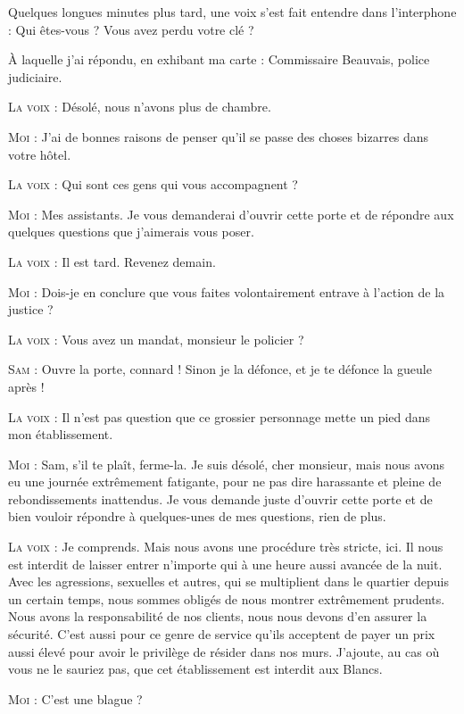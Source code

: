 \begin{dialogue}

Quelques longues minutes plus tard, une voix s’est fait entendre dans l’interphone : Qui êtes-vous ? Vous avez perdu votre clé ?

À laquelle j’ai répondu, en exhibant ma carte : Commissaire Beauvais, police judiciaire.

\textsc{La voix} : Désolé, nous n’avons plus de chambre.

\textsc{Moi} : J’ai de bonnes raisons de penser qu’il se passe des choses bizarres dans votre hôtel.

\textsc{La voix} : Qui sont ces gens qui vous accompagnent ?

\textsc{Moi} : Mes assistants. Je vous demanderai d’ouvrir cette porte et de répondre aux quelques questions que j’aimerais vous poser.

\textsc{La voix} : Il est tard. Revenez demain.

\textsc{Moi} : Dois-je en conclure que vous faites volontairement entrave à l’action de la justice ?

\textsc{La voix} : Vous avez un mandat, monsieur le policier ?

\textsc{Sam} : Ouvre la porte, connard ! Sinon je la défonce, et je te défonce la gueule après !

\textsc{La voix} : Il n’est pas question que ce grossier personnage mette un pied dans mon établissement.

\textsc{Moi} : Sam, s’il te plaît, ferme-la. Je suis désolé, cher monsieur, mais nous avons eu une journée extrêmement fatigante, pour ne pas dire harassante et pleine de rebondissements inattendus. Je vous demande juste d’ouvrir cette porte et de bien vouloir répondre à quelques-unes de mes questions, rien de plus.

\textsc{La voix} : Je comprends. Mais nous avons une procédure très stricte, ici. Il nous est interdit de laisser entrer n’importe qui à une heure aussi avancée de la nuit. Avec les agressions, sexuelles et autres, qui se multiplient dans le quartier depuis un certain temps, nous sommes obligés de nous montrer extrêmement prudents. Nous avons la responsabilité de nos clients, nous nous devons d’en assurer la sécurité. C’est aussi pour ce genre de service qu’ils acceptent de payer un prix aussi élevé pour avoir le privilège de résider dans nos murs. J’ajoute, au cas où vous ne le sauriez pas, que cet établissement est interdit aux Blancs.

\textsc{Moi} : C’est une blague ?


\end{dialogue}
